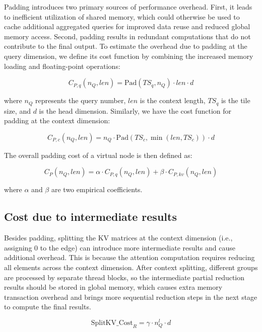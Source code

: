 Padding introduces two primary sources of performance overhead. First, it leads to inefficient utilization of shared memory, which could otherwise be used to cache additional aggregated queries for improved data reuse and reduced global memory access. Second, padding results in redundant computations that do not contribute to the final output. To estimate the overhead due to padding at the query dimension, we define its cost function by combining the increased memory loading and floating-point operations:

\begin{equation}
C_{P,q}(n_Q, len) = \text{Pad}(TS_q, n_Q) \cdot len \cdot d
\end{equation}

where $n_Q$ represents the query number, $len$ is the context
length, $TS_q$ is the tile size, and $d$ is the head dimension.
Similarly, we have the cost function for padding at the context
dimension:

\begin{equation}
C_{P,c}(n_Q, len) = n_Q \cdot \text{Pad}(TS_c, \min(len, TS_c)) \cdot d
\end{equation}

The overall padding cost of a virtual node is then defined as:

\begin{equation}
C_P(n_Q, len) = \alpha \cdot C_{P,q}(n_Q, len)
+ \beta \cdot C_{P,kv}(n_Q, len)
\end{equation}

\noindent
where $\alpha$ and $\beta$ are two empirical coefficients.

\subsection*{Cost due to intermediate results}
Besides padding, splitting the KV matrices at the context dimension (i.e., assigning $0$ to the edge) can introduce more intermediate results and cause additional overhead. This is because the attention computation requires reducing all elements across the context dimension. After context splitting, different groups are processed by separate thread blocks, so the intermediate partial reduction results should be stored in global memory, which causes extra memory transaction overhead and brings more sequential reduction steps in the next stage to compute the final results.


\begin{equation}
\text{SplitKV\_Cost}_R = \gamma \cdot n_Q^l \cdot d
\end{equation}


